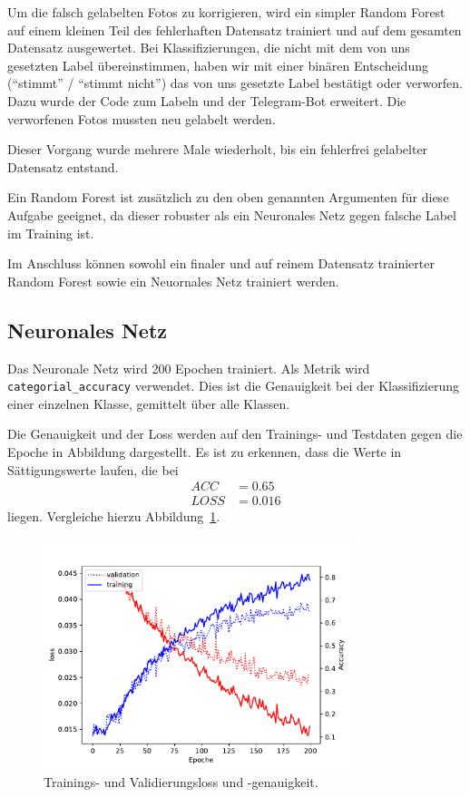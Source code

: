 Um die falsch gelabelten Fotos zu korrigieren, wird ein simpler Random
Forest auf einem kleinen Teil des fehlerhaften Datensatz trainiert und
auf dem gesamten Datensatz ausgewertet. Bei Klassifizierungen, die nicht
mit dem von uns gesetzten Label übereinstimmen, haben wir mit einer
binären Entscheidung (\enquote{stimmt} / \enquote{stimmt nicht}) das von uns
gesetzte Label bestätigt oder verworfen. Dazu wurde der Code zum Labeln
und der Telegram-Bot erweitert. Die verworfenen Fotos mussten neu
gelabelt werden.

Dieser Vorgang wurde mehrere Male wiederholt, bis ein fehlerfrei
gelabelter Datensatz entstand.

Ein Random Forest ist zusätzlich zu den oben genannten Argumenten für
diese Aufgabe geeignet, da dieser robuster als ein Neuronales Netz gegen
falsche Label im Training ist.

Im Anschluss können sowohl ein finaler und auf reinem Datensatz
trainierter Random Forest sowie ein Neuornales Netz trainiert werden.

\hypertarget{neuronales-netz-1}{%
\subsection{Neuronales Netz}\label{neuronales-netz-1}}

Das Neuronale Netz wird 200 Epochen trainiert. Als Metrik wird
\texttt{categorial\_accuracy} verwendet. Dies ist die Genauigkeit bei
der Klassifizierung einer einzelnen Klasse, gemittelt über alle Klassen.

Die Genauigkeit und der Loss werden auf den Trainings- und Testdaten
gegen die Epoche in Abbildung dargestellt. Es ist zu erkennen, dass die
Werte in Sättigungswerte laufen, die bei
\begin{align}
  ACC  &=  \num{0.65} \\
  LOSS &= \num{0.016}
\end{align}
liegen.
Vergleiche hierzu Abbildung~\ref{fig:train_nn}.

\begin{figure}
\centering
\includegraphics[width=0.8\textwidth]{content/train_nn.pdf}
\caption{Trainings- und Validierungsloss und -genauigkeit.}%
\label{fig:train_nn}
\end{figure}

